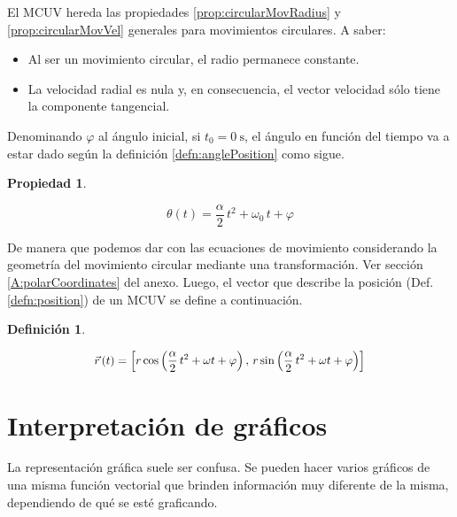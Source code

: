 \documentclass[a5paper,12pt,twoside]{book}
\newtheorem{defn}{{Definición}}[chapter]
\newtheorem{prop}{{Propiedad}}[chapter]
\begin{document}
El MCUV hereda las propiedades \ref{prop:circularMovRadius} y \ref{prop:circularMovVel} generales para movimientos circulares. A saber:
\begin{itemize}
    \item Al ser un movimiento circular, el radio permanece constante.
    
    \item La velocidad radial es nula y, en consecuencia, el vector velocidad sólo tiene la componente tangencial.
\end{itemize}

Denominando $\varphi$ al ángulo inicial, si $t_0=\SI{0}{\second}$, el ángulo en función del tiempo va a estar dado según la definición \ref{defn:anglePosition} como sigue.

\begin{mdframed}[style=MyFrame1]
    \begin{prop}
    \end{prop}
    \begin{equation*}
        \theta (t) = \frac{\alpha}{2} \, t^2 + \omega_0 \, t + \varphi
    \end{equation*}
\end{mdframed}

De manera que podemos dar con las ecuaciones de movimiento considerando la geometría del movimiento circular mediante una transformación. Ver sección \ref{A:polarCoordinates} del anexo. Luego, el vector que describe la posición (Def. \ref{defn:position}) de un MCUV se define a continuación.

\begin{mdframed}[style=MyFrame1]
    \begin{defn}
    \end{defn}
    \begin{equation*}
        \scale{0.94}{
        \xyz(t) = \sqb{r \cos{\left(\frac{\alpha}{2} \, t^2 + \omega t + \varphi\right)} \, , \, r \sin{\left(\frac{\alpha}{2} \, t^2 + \omega t + \varphi\right)}}
        }
    \end{equation*}
\end{mdframed}


\section{Interpretación de gráficos}

La representación gráfica suele ser confusa. Se pueden hacer varios gráficos de una misma función vectorial que brinden información muy diferente de la misma, dependiendo de qué se esté graficando.
\end{document}
